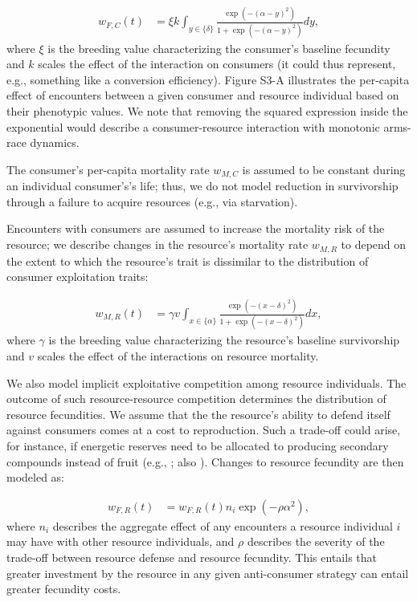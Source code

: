 \documentclass[11pt]{article}
\begin{document}
\begin{linenumbers}
\begin{align}
w_{F,C}(t) &= \xi k \int_{y \in \{\delta\}} \frac{\exp(-(\alpha-y)^2)}{1 + \exp(-(\alpha-y)^2)} dy, \label{eqn:consumer_fecundity}
\end{align}
where $\xi$ is the breeding value characterizing the consumer's baseline fecundity and $k$ scales the effect of the interaction on consumers (it could thus represent, e.g., something like a conversion efficiency). Figure S3-A illustrates the per-capita effect of encounters between a given consumer and resource individual based on their phenotypic values. We note that removing the squared expression inside the exponential would describe a consumer-resource interaction with monotonic arms-race dynamics. 

The consumer's per-capita mortality rate $w_{M,C}$ is assumed to be constant during an individual consumer's's life; thus, we do not model reduction in survivorship through a failure to acquire resources (e.g., via starvation).  

Encounters with consumers are assumed to increase the mortality risk of the resource; we describe changes in the resource's mortality rate $w_{M,R}$ to depend on the extent to which the resource's trait is dissimilar to the distribution of consumer exploitation traits:

\begin{align}
w_{M,R}(t) &=  \gamma v \int_{x \in \{\alpha\}} \frac{\exp(-(x-\delta)^2)}{1 + \exp(-(x - \delta)^2)} dx,\label{eqn:resource_mortality}
\end{align}
where $\gamma$ is the breeding value characterizing the resource's baseline survivorship and $v$ scales the effect of the interactions on resource mortality.

We also model implicit exploitative competition among resource individuals. The outcome of such resource-resource competition determines the distribution of resource fecundities. We assume that the the resource's ability to defend itself against consumers comes at a cost to reproduction. Such a trade-off could arise, for instance, if energetic reserves need to be allocated to producing secondary compounds instead of fruit (e.g., \citealt{bazzaz87}; also \citealt{bohannan97}). Changes to resource fecundity are then modeled as:

\begin{align}
w_{F,R}(t) &= w_{F,R}(t) n_i \exp(-\rho \alpha^2),
\label{eqn:resource_fecundity}
\end{align}
where $n_i$ describes the aggregate effect of any encounters a resource individual $i$ may have with other resource individuals, and $\rho$ describes the severity of the trade-off between resource defense and resource fecundity. This entails that greater investment by the resource in any given anti-consumer strategy can entail greater fecundity costs.


\end{linenumbers}
\end{document}
